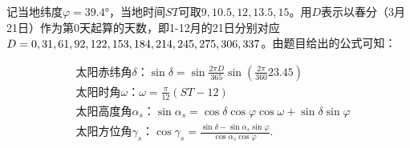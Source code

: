 \documentclass{article}
\numberwithin{equation}{subsection}
\begin{document}
记当地纬度$\varphi=39.4°$，当地时间$ST$可取$9, 10.5, 12, 13.5, 15$。用$D$表示以春分（3月21日）作为第0天起算的天数，即1-12月的21日分别对应$D=0,31,61,92,122,153,184,214,245,\\275,306,337$。由题目给出的公式可知：

\begin{equation}
    \begin{aligned}
        &\text{太阳赤纬角$\delta$：}\sin \delta=\sin \frac{2 \pi D}{365} \sin \left(\frac{2 \pi}{360} 23.45\right)\\
        &\text{太阳时角$\omega$：}\omega=\frac{\pi}{12}(S T-12)\\
        &\text{太阳高度角$\alpha_s$：}\sin \alpha_s=\cos \delta \cos \varphi \cos \omega+\sin \delta \sin \varphi\\
        &\text{太阳方位角$\gamma_s$：}\cos \gamma_s=\frac{\sin \delta-\sin \alpha_s \sin \varphi}{\cos \alpha_s \cos \varphi}.\\
    \end{aligned}
\end{equation}
\end{document}
